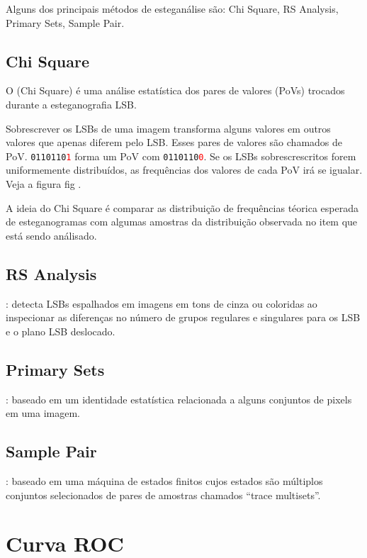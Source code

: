 Alguns dos principais métodos de esteganálise são: Chi Square, RS Analysis, Primary Sets, Sample Pair.

\subsection{Chi Square}
O \emph{\chisquare} (Chi Square) \cite{westfeld1999attacks} é uma análise estatística dos pares de valores (PoVs) trocados durante a esteganografia LSB.

Sobrescrever os LSBs de uma imagem transforma alguns valores em outros valores que apenas diferem pelo LSB. Esses pares de valores são chamados de PoV. \texttt{0110110\textcolor{red}{1}} forma um PoV com \texttt{0110110\textcolor{red}{0}}. Se os LSBs sobrescrescritos forem uniformemente distribuídos, as frequências dos valores de cada PoV irá se igualar. Veja a figura fig . %

A ideia do Chi Square é comparar as distribuição de frequências téorica esperada de esteganogramas com algumas amostras da distribuição observada no item que está sendo análisado.

\subsection{RS Analysis}
\cite{fridrich2001reliable}: detecta LSBs espalhados em imagens em tons de cinza ou coloridas ao inspecionar as diferenças no número de grupos regulares e singulares para os LSB e o plano LSB deslocado.

\subsection{Primary Sets}
\cite{dumitrescu2002steganalysis}: baseado em um identidade estatística relacionada a alguns conjuntos de pixels em uma imagem.

\subsection{Sample Pair}
\cite{dumitrescu2003detection}: baseado em uma máquina de estados finitos cujos estados são múltiplos conjuntos selecionados de pares de amostras chamados ``trace multisets''.


\section{Curva ROC}


